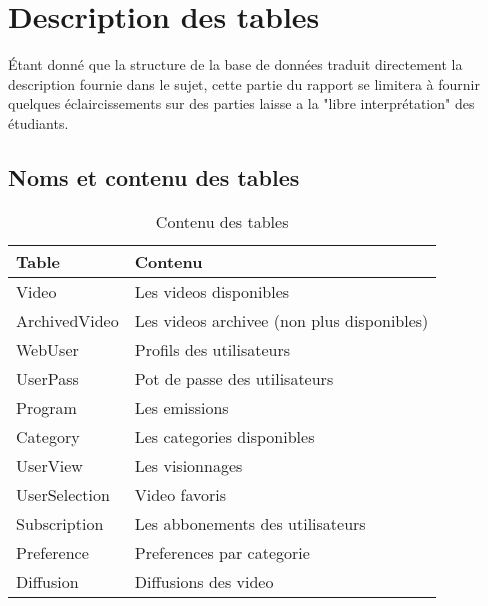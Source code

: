 \documentclass[twoside,openright,a4paper,11pt,french]{article}
\begin{document}
\section{Description des tables}
Étant donné que la structure de la base de données traduit directement la
description fournie dans le sujet, cette partie du rapport se limitera à
fournir quelques éclaircissements sur des parties laisse a la "libre
interprétation" des étudiants.

\newpage
\subsection{Noms et contenu des tables}
\begin{table}[h]
  \centering
  \begin{tabular}{| p{5cm} | l |}
    \hline
    \textbf{Table} & \textbf{Contenu} \\
    \hline
    Video & Les videos disponibles\\
    \hline
    ArchivedVideo  & Les videos archivee (non plus disponibles)\\
    \hline
    WebUser & Profils des utilisateurs \\
    \hline
    UserPass & Pot de passe des utilisateurs \\
    \hline
    Program & Les emissions \\
    \hline
    Category & Les categories disponibles \\
    \hline
    UserView & Les visionnages \\
    \hline
    UserSelection & Video favoris \\
    \hline
    Subscription & Les abbonements des utilisateurs \\
    \hline
    Preference & Preferences par categorie \\
    \hline
    Diffusion & Diffusions des video \\
    \hline
  \end{tabular}
  \caption{Contenu des tables}
  \label{tab:tables}
\end{table}
\end{document}
